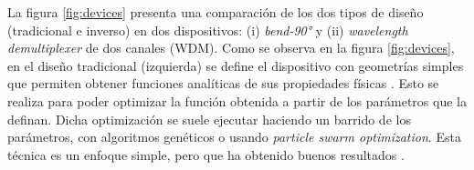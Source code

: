 


La figura \ref{fig:devices} presenta una comparación de los dos tipos de diseño
(tradicional e inverso) en dos dispositivos: (i) \emph{bend-90°} y (ii)
\emph{wavelength demultiplexer} de dos canales (WDM).
Como se observa en la figura \ref{fig:devices}, en el diseño tradicional (izquierda) se define el dispositivo con geometrías simples que permiten obtener funciones analíticas de sus propiedades físicas \citep{Hughes2016, Song2008}. 
Esto se realiza para poder optimizar la función obtenida a partir de los parámetros que la definan. 
Dicha optimización se suele ejecutar haciendo un barrido de los parámetros, con algoritmos genéticos o usando \emph{particle swarm optimization}. 
Esta técnica es un enfoque simple, pero que ha obtenido buenos resultados
\citep{Su2020}. 


